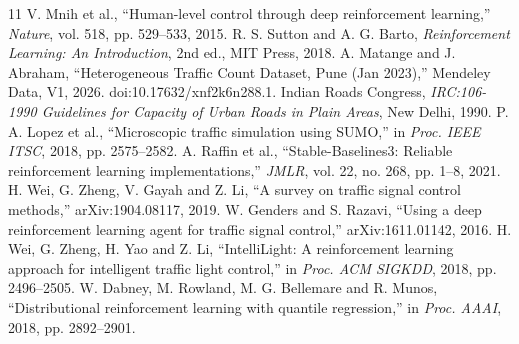 \documentclass[12pt,a4paper]{article}
\begin{document}
\clearpage
\nocite{*}
\begin{thebibliography}{11}
 V. Mnih et al., ``Human-level control through deep reinforcement learning,''
  \emph{Nature}, vol. 518, pp. 529--533, 2015.
 R. S. Sutton and A. G. Barto, \emph{Reinforcement Learning: An Introduction},
  2nd ed., MIT Press, 2018.
 A. Matange and J. Abraham, ``Heterogeneous Traffic Count Dataset, Pune (Jan 2023),''
  Mendeley Data, V1, 2026. doi:10.17632/xnf2k6n288.1.
 Indian Roads Congress, \emph{IRC:106-1990 Guidelines for Capacity of Urban Roads in
  Plain Areas}, New Delhi, 1990.
 P. A. Lopez et al., ``Microscopic traffic simulation using SUMO,''
  in \emph{Proc. IEEE ITSC}, 2018, pp. 2575--2582.
 A. Raffin et al., ``Stable-Baselines3: Reliable reinforcement learning implementations,''
  \emph{JMLR}, vol. 22, no. 268, pp. 1--8, 2021.
 H. Wei, G. Zheng, V. Gayah and Z. Li, ``A survey on traffic signal control methods,''
  arXiv:1904.08117, 2019.
 W. Genders and S. Razavi, ``Using a deep reinforcement learning agent for
  traffic signal control,'' arXiv:1611.01142, 2016.
 H. Wei, G. Zheng, H. Yao and Z. Li, ``IntelliLight: A reinforcement learning approach
  for intelligent traffic light control,'' in \emph{Proc. ACM SIGKDD}, 2018, pp. 2496--2505.
 W. Dabney, M. Rowland, M. G. Bellemare and R. Munos, ``Distributional reinforcement
  learning with quantile regression,'' in \emph{Proc. AAAI}, 2018, pp. 2892--2901.
\end{thebibliography}
\end{document}
